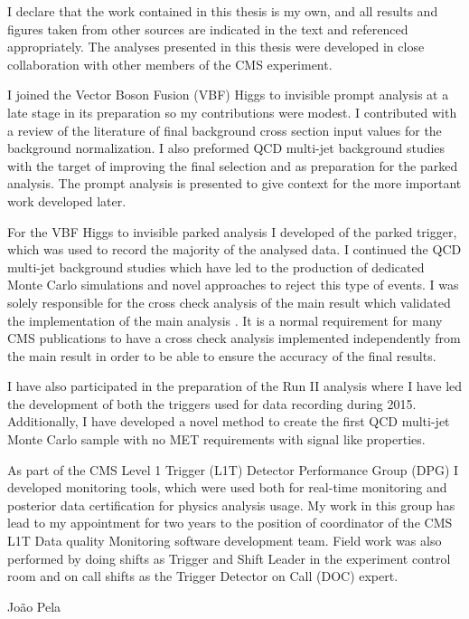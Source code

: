 \begin{declaration}
I declare that the work contained in this thesis is my own, and all results and figures taken from other sources are indicated in the text and referenced appropriately. The analyses presented in this thesis were developed in close collaboration with other members of the CMS experiment.

I joined the Vector Boson Fusion (VBF) Higgs to invisible prompt analysis at a late stage in its preparation so my contributions were modest. I contributed with a review of the literature of final background cross section input values for the background normalization. I also preformed QCD multi-jet background studies with the target of improving the final selection and as preparation for the parked analysis. The prompt analysis is presented to give context for the more important work developed later. 

For the VBF Higgs to invisible parked analysis I developed of the parked trigger, which was used to record the majority of the analysed data. I continued the QCD multi-jet background studies which have led to the production of dedicated Monte Carlo simulations and novel approaches to reject this type of events. I was solely responsible for the cross check analysis of the main result which validated the implementation of the main analysis \cite{ARTICLE:CMSVBFHiggsInvisibleParkedAnalysisPAS}. It is a normal requirement for many CMS publications to have a cross check analysis implemented independently from the main result in order to be able to ensure the accuracy of the final results. 

I have also participated in the preparation of the Run II analysis where I have led the development of both the triggers used for data recording during 2015. Additionally, I have developed a novel method to create the first QCD multi-jet Monte Carlo sample with no MET requirements with signal like properties.

As part of the CMS Level 1 Trigger (L1T) Detector Performance Group (DPG) I developed monitoring tools, which were used both for real-time monitoring and posterior data certification for physics analysis usage. My work in this group has lead to my appointment for two years to the position of coordinator of the \gls{CMS} \gls{L1T} Data quality Monitoring software development team. Field work was also performed by doing shifts as Trigger and Shift Leader in the experiment control room and on call shifts as the Trigger Detector on Call (DOC) expert.
 
\vspace*{1cm}
\begin{flushright}
João Pela
\end{flushright}
\end{declaration}


